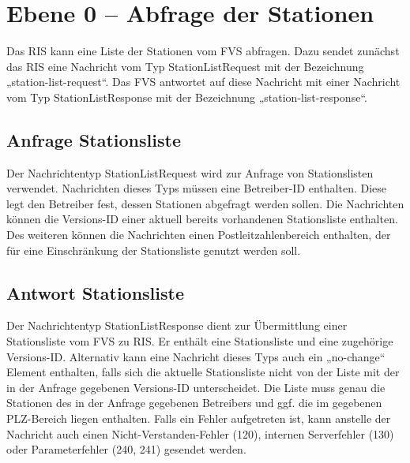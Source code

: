 


\section{Ebene 0 -- Abfrage der Stationen}
Das RIS kann eine Liste der Stationen vom FVS abfragen. Dazu sendet zunächst das RIS eine Nachricht vom Typ StationListRequest mit der Bezeichnung „station-list-request“. Das FVS antwortet auf diese Nachricht mit einer Nachricht vom Typ StationListResponse mit der Bezeichnung „station-list-response“.



\subsection{Anfrage Stationsliste}
Der Nachrichtentyp StationListRequest wird zur Anfrage von Stationslisten verwendet. Nachrichten dieses Typs müssen eine Betreiber-ID enthalten. Diese legt den Betreiber fest, dessen Stationen abgefragt werden sollen. Die Nachrichten können die Versions-ID einer aktuell bereits vorhandenen Stationsliste enthalten. Des weiteren können die Nachrichten einen Postleitzahlenbereich enthalten, der für eine Einschränkung der Stationsliste genutzt werden soll.



\subsection{Antwort Stationsliste}
Der Nachrichtentyp StationListResponse dient zur Übermittlung einer Stationsliste vom FVS zu RIS. Er enthält eine Stationsliste und eine zugehörige Versions-ID. Alternativ kann eine Nachricht dieses Typs auch ein „no-change“ Element enthalten, falls sich die aktuelle Stationsliste nicht von der Liste mit der in der Anfrage gegebenen Versions-ID  unterscheidet. Die Liste muss genau die Stationen des in der Anfrage gegebenen Betreibers und ggf. die im gegebenen PLZ-Bereich liegen enthalten. Falls ein Fehler aufgetreten ist, kann anstelle der Nachricht auch einen Nicht-Verstanden-Fehler (120), internen Serverfehler (130) oder Parameterfehler (240, 241) gesendet werden.




